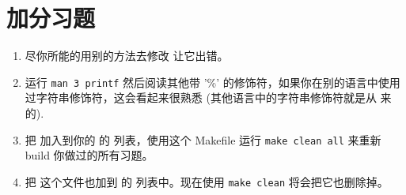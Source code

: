 \section{加分习题}

\begin{enumerate}
\item 尽你所能的用别的方法去修改  让它出错。
\item 运行 \verb|man 3 printf| 然后阅读其他带 '\%' 的修饰符，如果你在别的语言中使用过字符串修饰符，这会看起来很熟悉 (其他语言中的字符串修饰符就是从  来的).
\item 把  加入到你的 的  列表，使用这个 Makefile 运行 \verb|make clean all| 来重新 build 你做过的所有习题。
\item 把  这个文件也加到  的  列表中。现在使用 \verb|make clean| 将会把它也删除掉。
\end{enumerate}


